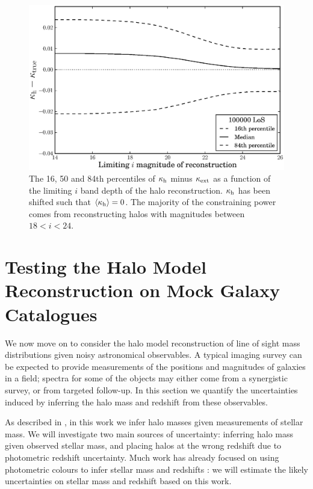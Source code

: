 \documentclass[useAMS,usenatbib]{mn2e}
\begin{document}
\begin{figure}
\includegraphics[width=\columnwidth]{figs/mag_scatter.eps}
\caption[magcut]{The 16, 50 and 84th percentiles of $\kappa_{\rm h}$ minus
$\kappa_{\rm ext}$ as a function of the limiting $i$ band depth of the halo
reconstruction. $\kappa_{\rm h}$ has been shifted such that
$\left\langle\kappa_{\rm h}\right\rangle=0$. The majority of the constraining power
comes from reconstructing halos with magnitudes between $18<i<24$.}
\label{fig:magcut}
\end{figure}



\section{Testing the Halo Model Reconstruction on Mock Galaxy Catalogues}
\label{sec:obsMstar+z}

We now move on to consider the halo model reconstruction of line of sight mass
distributions given noisy astronomical observables. A typical imaging survey
can be expected to provide measurements of the positions and magnitudes of
galaxies in a field;  spectra for some of the objects may either come from a
synergistic survey, or from targeted follow-up. In this section we quantify
the uncertainties induced by inferring the halo mass and redshift from these
observables. 

As described in , in this work we infer halo masses
given measurements of stellar mass. We will investigate two main sources of
uncertainty: inferring halo mass given observed stellar mass, and placing halos at
the wrong redshift due to photometric redshift uncertainty. Much work has already
focused on using photometric colours to infer stellar mass
\citep[\eg][]{AugerEtal2009} and redshifts \citep[\eg][]{BPZ}: we will
estimate the likely uncertainties on stellar mass and redshift based on this
work.  
\end{document}
